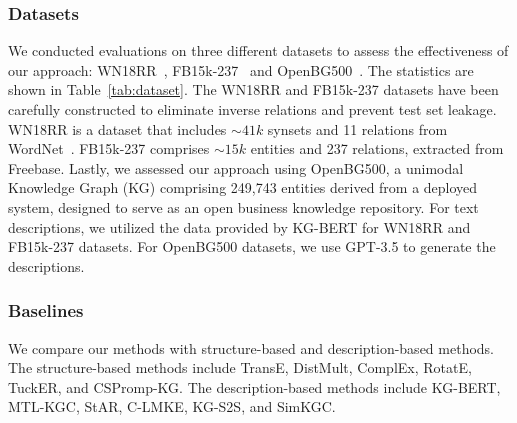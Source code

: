\documentclass[11pt]{article}
\begin{document}
\subsubsection{Datasets}
We conducted evaluations on three different datasets to assess the effectiveness of our approach: WN18RR~\cite{Dettmers2017Convolutional2K}, FB15k-237~\cite{Ma2015KnowledgeGI} and OpenBG500~\cite{Deng2022ConstructionAA}. The statistics are shown in Table~\ref{tab:dataset}. The WN18RR and FB15k-237 datasets have been carefully constructed to eliminate inverse relations and prevent test set leakage. WN18RR is a dataset that includes $\sim 41k$ synsets and 11 relations from WordNet~\cite{miller1995wordnet}. FB15k-237 comprises $\sim 15k$ entities and 237 relations, extracted from Freebase. Lastly, we assessed our approach using OpenBG500, a unimodal Knowledge Graph (KG) comprising 249,743 entities derived from a deployed system, designed to serve as an open business knowledge repository. For text descriptions, we utilized the data provided by KG-BERT\cite{yao2019kg} for WN18RR and FB15k-237 datasets. For OpenBG500 datasets, we use GPT-3.5\cite{Chen2020BigSM} to generate the descriptions.

\begin{table}[ht]
\centering
{}
\caption{Overall statistics of benchmark datasets.}
\label{tab:dataset}
\end{table}

\subsubsection{Baselines} 
We compare our methods with structure-based and description-based methods. The structure-based methods include TransE, DistMult, ComplEx, RotatE, TuckER, and CSPromp-KG. The description-based methods include KG-BERT, MTL-KGC, StAR, C-LMKE, KG-S2S, and SimKGC.
\end{document}
